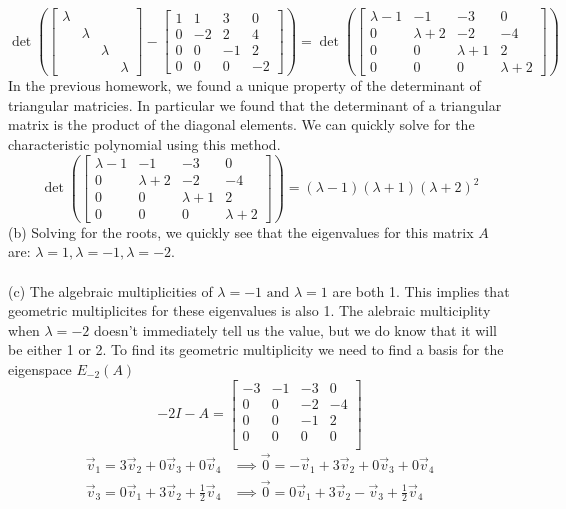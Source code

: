 \documentclass{report}
\begin{document}
$$
\det\left(\begin{bmatrix}
\lambda&&&\\
&\lambda&&\\
&&\lambda&\\
&&&\lambda
\end{bmatrix} - \begin{bmatrix}
1&1&3&0\\
0&-2&2&4\\
0&0&-1&2\\
0&0&0&-2
\end{bmatrix}
\right) =
\det\left(
\begin{bmatrix}
\lambda-1&-1&-3&0\\
0&\lambda+2&-2&-4\\
0&0&\lambda+1&2\\
0&0&0&\lambda+2
\end{bmatrix}
\right)
$$
In the previous homework, we found a unique property of the determinant of triangular matricies. In particular we found that the determinant of a triangular matrix is the product of the diagonal elements. We can quickly solve for the characteristic polynomial using this method.
$$
\det\left(
\begin{bmatrix}
\lambda-1&-1&-3&0\\
0&\lambda+2&-2&-4\\
0&0&\lambda+1&2\\
0&0&0&\lambda+2
\end{bmatrix}
\right) =
(\lambda-1)(\lambda+1)(\lambda+2)^2
$$
(b) Solving for the roots, we quickly see that the eigenvalues for this matrix $A$ are: $\lambda = 1, \lambda = -1, \lambda = -2$. \\
\\
\noindent (c) The algebraic multiplicities of $\lambda = -1 \text{ and } \lambda = 1$ are both 1. This implies that geometric multiplicites for these eigenvalues is also 1.  The alebraic multiciplity when $\lambda = -2$ doesn't immediately tell us the value,  but we do know that it will be either 1 or 2.  To find its geometric multiplicity we need to find a basis for the eigenspace $E_{-2}(A)$
$$
-2I - A = 
\begin{bmatrix}
-3&-1&-3&0\\
0&0&-2&-4\\
0&0&-1&2\\
0&0&0&0\\
\end{bmatrix}
$$
$$
\begin{aligned}
\vec{v}_1 = 3\vec{v}_2 + 0\vec{v}_3 + 0\vec{v}_4 &\implies \vec{0} = -\vec{v}_1 + 3\vec{v}_2 + 0\vec{v}_3 + 0\vec{v}_4  \\
\vec{v}_3 = 0\vec{v}_1 + 3\vec{v}_2 + \frac{1}{2}\vec{v}_4 &\implies \vec{0} = 0\vec{v}_1 + 3\vec{v}_2 -\vec{v}_3+\frac{1}{2}\vec{v}_4
\end{aligned}
$$
\end{document}
